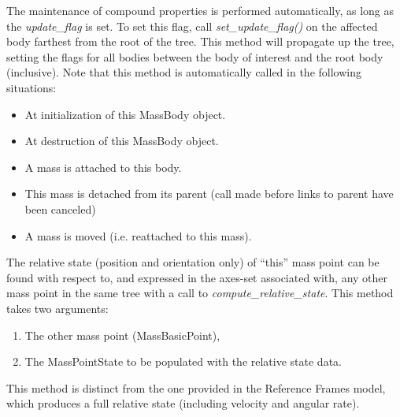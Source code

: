 The maintenance of compound properties is performed automatically, as long as 
the \textit{update\_flag} is set.  To set this flag, call 
\textit{set\_update\_flag()} on the affected body farthest from the root of 
the 
tree.  This method will propagate up the tree, setting the flags for all 
bodies between the body of interest and the root body (inclusive).
Note that this method is automatically called in the following situations:
\begin{itemize}
 \item At initialization of this MassBody object.
 \item At destruction of this MassBody object.
 \item A mass is attached to this body.
 \item This mass is detached from its parent (call made before links to parent 
 have been canceled)
 \item A mass is moved (i.e. reattached to this mass).
\end{itemize}

The relative state (position and orientation only) of ``this'' mass point can 
be found with respect to, and expressed in the axes-set associated with, any 
other mass point in the same tree with a call to 
\textit{compute\_relative\_state}.  This method takes two arguments:
\begin{enumerate}
 \item The other mass point (MassBasicPoint),
 \item The MassPointState to be populated with the relative state data. 
\end{enumerate}

This method is distinct from the one provided in the Reference Frames model, 
which produces a full relative state (including velocity and angular rate).
